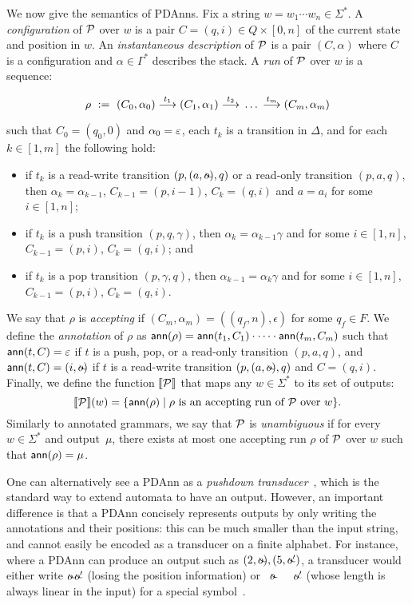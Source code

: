 %

We now give the semantics of PDAnns.  Fix a string $w = w_1 \cdots
w_n \in \Sigma^*$. A \emph{configuration} of $\mathcal{P}$ over $w$ is a pair
$C = (q, i) \in Q\times [0,n]$ of the current state and position in
$w$. An \emph{instantaneous description} of $\mathcal{P}$ is a pair
$(C, \alpha)$ where $C$ is a configuration and $\alpha\in \Gamma^*$
describes the stack. A \emph{run} of $\mathcal{P}$ over $w$ is a sequence:

\begin{equation}  \label{gram:eq:run} %
	\rho \ := \ (C_0, \alpha_0) \trans{t_1} (C_1, \alpha_1) \trans{t_2} \, \ldots \, \trans{t_m} (C_m, \alpha_m)
\end{equation}

such that $C_0 = (q_0, 0)$ and $\alpha_0 = \varepsilon$, each $t_k$ is a transition in $\Delta$, and for each $k\in[1,m]$ the following hold: 
\begin{itemize}
	\item if $t_k$ is a read-write transition $(p, (a, \oout), q)$ or a read-only transition $(p, a, q)$, then $\alpha_k = \alpha_{k-1}$, $C_{k-1} = (p, i-1)$, $C_{k} = (q, i)$ and $a = a_i$ for some $i\in [1,n]$;
	\item if $t_k$ is a push transition $(p, q, \gamma)$, then $\alpha_k = \alpha_{k-1}\gamma$ and for some $i\in [1,n]$, $C_{k-1} = (p,i)$, $C_k = (q,i)$; and
	\item if $t_k$ is a pop transition $(p,\gamma,q)$, then  $\alpha_{k-1} = \alpha_k \gamma$ and for some $i\in [1,n]$, $C_{k-1} = (p,i)$, $C_k = (q,i)$.
\end{itemize}
We say that $\rho$ is \emph{accepting} if $(C_m, \alpha_m) = ((q_f, n), \epsilon)$ for
some $q_f\in F$.
We define the \emph{annotation} of $\rho$ as $\textsf{ann}(\rho) = \textsf{ann}(t_1, C_1) \cdot \cdots \cdot \textsf{ann}(t_m, C_m)$ such that $\textsf{ann}(t, C) = \varepsilon$ if $t$ is a push, pop, or a  read-only transition $(p, a, q)$, and $\ann(t, C) = (i, \oout)$ if $t$ is a read-write transition $(p, (a, \oout), q)$ and $C = (q, i)$.
Finally, we define the function ${\llbracket{\mathcal{P}}\rrbracket}$ that maps any $w \in \Sigma^*$ to its set of outputs:
\[
{\llbracket{\mathcal{P}}\rrbracket}(w) =
\{\textsf{ann}(\rho) \mid \text{$\rho$ is an accepting run of $\mathcal{P}$ over $w$}\}.
\]
Similarly to annotated grammars, we say that $\mathcal{P}$ is \emph{unambiguous} if for every $w\in \Sigma^*$ and output~$\mu$, there exists at most one accepting run $\rho$ of $\mathcal{P}$ over $w$ such that $\textsf{ann}(\rho) = \mu$. 

One can alternatively see a PDAnn as a \emph{pushdown transducer}~\cite{berstel2013transductions}, which is the standard way to extend automata to have an output. However, an important difference is that a PDAnn concisely represents outputs by only writing the annotations and their positions: this can be much smaller than the input string, and cannot easily be encoded as a transducer on a finite alphabet. For instance, where a PDAnn can produce an output such as $(2,\oout), (5, \oout')$, a transducer would either write $\oout \oout'$ (losing the position information) or \textvisiblespace~$\oout$~\textvisiblespace~\textvisiblespace~$\oout'$ (whose length is always linear in the input) for a special symbol~\textvisiblespace.

